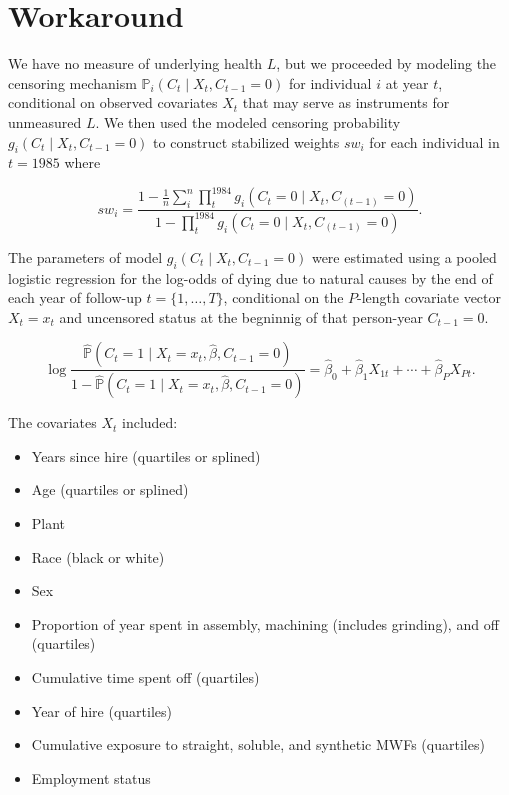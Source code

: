 \documentclass[
  11pt,
  letterpaper,
  DIV=11,
  numbers=noendperiod]{scrartcl}
\providecommand{\tightlist}{%
  \setlength{\itemsep}{0pt}\setlength{\parskip}{0pt}}\usepackage{longtable,booktabs,array}
\theoremstyle{remark}\newtheorem*{claim}{Claim}
\begin{document}
\hypertarget{workaround}{%
\section{Workaround}\label{workaround}}

We have no measure of underlying health \(L\), but we proceeded by
modeling the censoring mechanism
\(\mathbb P_{i}(C_t \mid X_t ,C_{t - 1} = 0)\) for individual \(i\) at
year \(t\), conditional on observed covariates \(X_t\) that may serve as
instruments for unmeasured \(L\). We then used the modeled censoring
probability \(g_i(C_t\mid X_t ,C_{t - 1} = 0)\) to construct stabilized
weights \(sw_i\) for each individual in \(t = 1985\) where

\[sw_i = \frac{1 - \frac{1}{n}\sum^n_i \mathbb \prod_t^{1984} g_i(C_{t}  = 0\mid X_{t} ,C_{(t - 1)} = 0)}{1 - \prod_t^{1984} g_i(C_{t}  = 0 \mid X_{t} ,C_{(t - 1)} = 0)}.\]

The parameters of model \(g_i(C_t \mid X_t, C_{t - 1} = 0)\) were
estimated using a pooled logistic regression for the log-odds of dying
due to natural causes by the end of each year of follow-up
\(t = \{1, \dots, T\}\), conditional on the \(P\)-length covariate
vector \(X_t = x_t\) and uncensored status at the begninnig of that
person-year \(C_{t - 1} = 0\).

\[\log\frac{\widehat{\mathbb P}\left(C_{t} = 1 \mid X_{t} = x_t, \hat{\beta}, C_{t - 1} = 0\right)}{1 - \widehat{\mathbb P}\left(C_{t} = 1 \mid X_{t} = x_t, \hat{\beta}, C_{t - 1} = 0\right)}
= \hat{\beta}_{0} + \hat{\beta}_1 X_{1t} +  \cdots + \hat{\beta}_P X_{Pt}.\]

The covariates \(X_t\) included:

\begin{itemize}
\tightlist
\item
  Years since hire (quartiles or splined)
\item
  Age (quartiles or splined)
\item
  Plant
\item
  Race (black or white)
\item
  Sex
\item
  Proportion of year spent in assembly, machining (includes grinding),
  and off (quartiles)
\item
  Cumulative time spent off (quartiles)
\item
  Year of hire (quartiles)
\item
  Cumulative exposure to straight, soluble, and synthetic MWFs
  (quartiles)
\item
  Employment status
\end{itemize}
\end{document}
